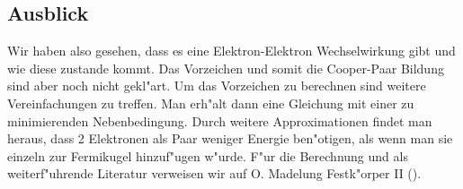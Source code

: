 \begin{refsection}
\section{Ausblick}
Wir haben also gesehen, dass es eine Elektron-Elektron Wechselwirkung gibt und wie diese zustande kommt. Das Vorzeichen und somit die Cooper-Paar Bildung sind aber noch nicht gekl"art. Um das Vorzeichen zu berechnen sind weitere Vereinfachungen zu treffen. Man erh"alt dann eine Gleichung mit einer zu minimierenden Nebenbedingung. Durch weitere Approximationen findet man heraus, dass 2 Elektronen als Paar weniger Energie ben"otigen, als wenn man sie einzeln zur Fermikugel hinzuf"ugen w"urde. F"ur die Berechnung und als weiterf"uhrende Literatur verweisen wir auf O. Madelung Festk"orper II (\cite{skript:madelung1}).


\printbibliography[heading=subbibliography]
\end{refsection}



